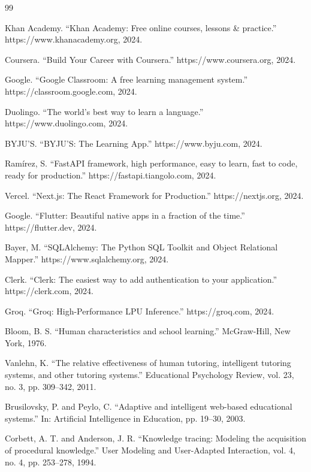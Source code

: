 \documentclass[10pt,conference,compsocconf]{IEEEtran}
\begin{document}
\begin{thebibliography}{99}

 Khan Academy. ``Khan Academy: Free online courses, lessons \& practice.'' https://www.khanacademy.org, 2024.

 Coursera. ``Build Your Career with Coursera.'' https://www.coursera.org, 2024.

 Google. ``Google Classroom: A free learning management system.'' https://classroom.google.com, 2024.

 Duolingo. ``The world's best way to learn a language.'' https://www.duolingo.com, 2024.

 BYJU'S. ``BYJU'S: The Learning App.'' https://www.byju.com, 2024.

 Ramírez, S. ``FastAPI framework, high performance, easy to learn, fast to code, ready for production.'' https://fastapi.tiangolo.com, 2024.

 Vercel. ``Next.js: The React Framework for Production.'' https://nextjs.org, 2024.

 Google. ``Flutter: Beautiful native apps in a fraction of the time.'' https://flutter.dev, 2024.

 Bayer, M. ``SQLAlchemy: The Python SQL Toolkit and Object Relational Mapper.'' https://www.sqlalchemy.org, 2024.

 Clerk. ``Clerk: The easiest way to add authentication to your application.'' https://clerk.com, 2024.

 Groq. ``Groq: High-Performance LPU Inference.'' https://groq.com, 2024.

 Bloom, B. S. ``Human characteristics and school learning.'' McGraw-Hill, New York, 1976.

 Vanlehn, K. ``The relative effectiveness of human tutoring, intelligent tutoring systems, and other tutoring systems.'' Educational Psychology Review, vol. 23, no. 3, pp. 309--342, 2011.

 Brusilovsky, P. and Peylo, C. ``Adaptive and intelligent web-based educational systems.'' In: Artificial Intelligence in Education, pp. 19--30, 2003.

 Corbett, A. T. and Anderson, J. R. ``Knowledge tracing: Modeling the acquisition of procedural knowledge.'' User Modeling and User-Adapted Interaction, vol. 4, no. 4, pp. 253--278, 1994.


\end{thebibliography}
\end{document}
